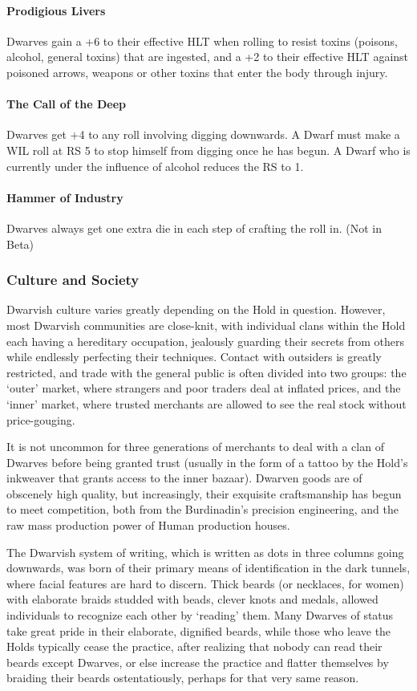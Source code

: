 \documentclass[oneside,11pt,english]{book}
\begin{document}
\paragraph{Prodigious Livers}
Dwarves gain a +6 to their effective HLT when rolling to resist toxins (poisons, alcohol, general toxins) that are ingested, and a +2 to their effective HLT against poisoned arrows, weapons or other toxins that enter the body through injury.
\paragraph{The Call of the Deep}
Dwarves get +4 to any roll involving digging downwards. A Dwarf must make a WIL roll at RS 5 
to stop himself from digging once he has begun. A Dwarf who is currently under the influence of 
alcohol reduces the RS to 1. 
\paragraph{Hammer of Industry}
Dwarves always get one extra die in each step of crafting the roll in. (Not in Beta) 
\subsubsection*{Culture and Society} 
Dwarvish culture varies greatly depending on the Hold in question. However, most Dwarvish 
communities are close-knit, with individual clans within the Hold each having a hereditary occupation, 
jealously guarding their secrets from others while endlessly perfecting their techniques. Contact with 
outsiders is greatly restricted, and trade with the general public is often divided into two groups: the 
‘outer’ market, where strangers and poor traders deal at inflated prices, and the ‘inner’ market, where 
trusted merchants are allowed to see the real stock without price-gouging. 


It is not uncommon for three generations of merchants to deal with a clan of Dwarves before being 
granted trust (usually in the form of a tattoo by the Hold's inkweaver that grants access to the inner 
bazaar). Dwarven goods are of obscenely high quality, but increasingly, their exquisite craftsmanship has 
begun to meet competition, both from the Burdinadin's precision engineering, and the raw mass 
production power of Human production houses. 

 
The Dwarvish system of writing, which is written as dots in three columns going downwards, was born of 
their primary means of identification in the dark tunnels, where facial features are hard to discern. Thick 
beards (or necklaces, for women) with elaborate braids studded with beads, clever knots and medals, 
allowed individuals to recognize each other by ‘reading’ them. Many Dwarves of status take great pride 
in their elaborate, dignified beards, while those who leave the Holds typically cease the practice, after 
realizing that nobody can read their beards except Dwarves, or else increase the practice and flatter 
themselves by braiding their beards ostentatiously, perhaps for that very same reason. 
\end{document}
